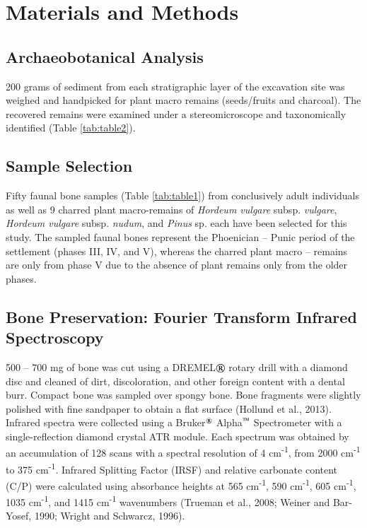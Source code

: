 \documentclass[review]{elsarticle} %
\begin{document}
\hypertarget{materials-and-methods}{%
\section{Materials and Methods}\label{materials-and-methods}}

\hypertarget{archaeobotanical-analysis}{%
\subsection{Archaeobotanical Analysis}\label{archaeobotanical-analysis}}

200 grams of sediment from each stratigraphic layer of the excavation site was weighed and handpicked for plant macro remains (seeds/fruits and charcoal). The recovered remains were examined under a stereomicroscope and taxonomically identified (Table \ref{tab:table2}).

\hypertarget{sample-selection}{%
\subsection{Sample Selection}\label{sample-selection}}

Fifty faunal bone samples (Table \ref{tab:table1}) from conclusively adult individuals as well as 9 charred plant macro-remains of \emph{Hordeum vulgare} subsp. \emph{vulgare}, \emph{Hordeum vulgare} subsp. \emph{nudum}, and \emph{Pinus} sp. each have been selected for this study. The sampled faunal bones represent the Phoenician -- Punic period of the settlement (phases III, IV, and V), whereas the charred plant macro -- remains are only from phase V due to the absence of plant remains only from the older phases.

\hypertarget{bone-preservation-fourier-transform-infrared-spectroscopy}{%
\subsection{Bone Preservation: Fourier Transform Infrared Spectroscopy}\label{bone-preservation-fourier-transform-infrared-spectroscopy}}

500 -- 700 mg of bone was cut using a DREMEL\(\text{\textregistered}\) rotary drill with a diamond disc and cleaned of dirt, discoloration, and other foreign content with a dental burr. Compact bone was sampled over spongy bone. Bone fragments were slightly polished with fine sandpaper to obtain a flat surface (Hollund et al., 2013). Infrared spectra were collected using a Bruker\(^\text{\textregistered}\) Alpha\(^\text{\texttrademark}\) Spectrometer with a single-reflection diamond crystal ATR module. Each spectrum was obtained by an accumulation of 128 scans with a spectral resolution of 4 cm\textsuperscript{-1}, from 2000 cm\textsuperscript{-1} to 375 cm\textsuperscript{-1}. Infrared Splitting Factor (IRSF) and relative carbonate content (C/P) were calculated using absorbance heights at 565 cm\textsuperscript{-1}, 590 cm\textsuperscript{-1}, 605 cm\textsuperscript{-1}, 1035 cm\textsuperscript{-1}, and 1415 cm\textsuperscript{-1} wavenumbers (Trueman et al., 2008; Weiner and Bar-Yosef, 1990; Wright and Schwarcz, 1996).
\end{document}
